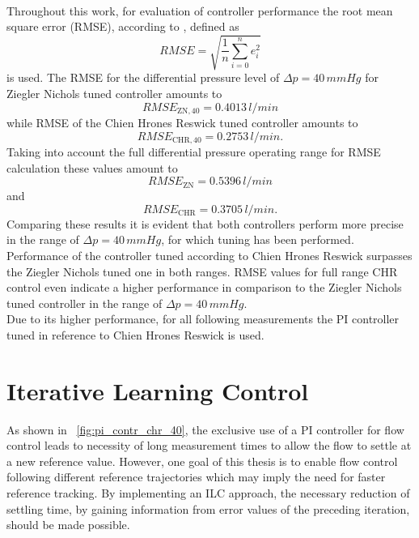 \\Throughout this work, for evaluation of controller performance the root mean square error (RMSE), according to \cite{RMSE}, defined as
\begin{equation}
  RMSE = \sqrt{\frac{1}{n}\sum_{i=0}^n e_i^2}
\end{equation}
is used. The RMSE for the differential pressure level of $\Delta{p}=40\,mmHg$ for Ziegler Nichols tuned controller amounts to
\begin{equation}
  RMSE_{\mathrm{ZN,40}}=0.4013\,l/min
\end{equation}
while RMSE of the Chien Hrones Reswick tuned controller amounts to
\begin{equation}
  RMSE_{\mathrm{CHR,40}}=0.2753\,l/min.
\end{equation}
Taking into account the full differential pressure operating range for RMSE calculation these values amount to
\begin{equation}
  RMSE_{\mathrm{ZN}}=0.5396\,l/min
\end{equation}
and
\begin{equation}
  RMSE_{\mathrm{CHR}}=0.3705\,l/min.
\end{equation}
Comparing these results it is evident that both controllers perform more precise in the range of $\Delta{p}=40\,mmHg$, for which tuning has been performed.
Performance of the controller tuned according to Chien Hrones Reswick surpasses the Ziegler Nichols tuned one in both ranges. RMSE values for full range CHR control even indicate a higher performance in comparison to the Ziegler Nichols tuned controller in the range of $\Delta{p}=40\,mmHg$.
\\ Due to its higher performance, for all following measurements the PI controller tuned in reference to Chien Hrones Reswick is used.
\section{Iterative Learning Control}\label{ILC_1}
As shown in \figurename~\ref{fig:pi_contr_chr_40}, the exclusive use of a PI controller for flow control leads to necessity of long measurement times to allow the flow to settle at a new reference value. However, one goal of this thesis is to enable flow control following different reference trajectories which may imply the need for faster reference tracking. By implementing an ILC approach, the necessary reduction of settling time, by gaining information from error values of the preceding iteration, should be made possible.
